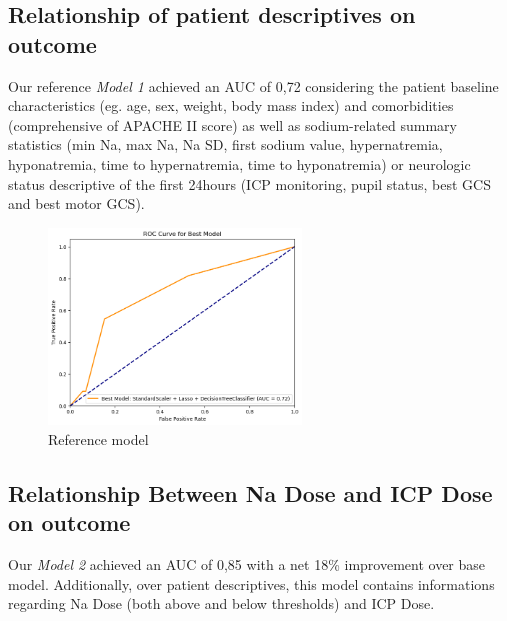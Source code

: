 \subsection{Relationship of patient descriptives on outcome}
Our reference \textit{Model 1} achieved an AUC of 0,72 considering the patient baseline characteristics (eg. age, sex, weight, body mass index) and comorbidities (comprehensive of APACHE II score) as well as sodium-related summary statistics (min Na, max Na, Na SD, first sodium value, hypernatremia, hyponatremia, time to hypernatremia, time to hyponatremia) or neurologic status descriptive of the first 24hours (ICP monitoring, pupil status, best GCS and best motor GCS).
\begin{figure}[h]
    \centering
    \includegraphics[width=0.6\textwidth]{pictures/fig5_basemodel.png}
    \caption{Reference model} %
    \label{fig:model1} %
\end{figure}

\subsection{Relationship Between Na Dose and ICP Dose on outcome}
Our \textit{Model 2} achieved an AUC of 0,85 with a net 18\% improvement over base model. Additionally, over patient descriptives, this model contains informations regarding Na Dose (both above and below thresholds) and ICP Dose.

